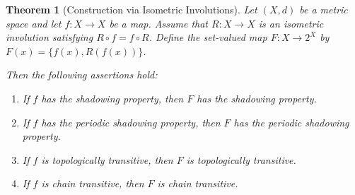 \documentclass[10pt,a4paper]{amsart}
\newtheorem{theorem}{Theorem}
\begin{document}
\begin{theorem}[Construction via Isometric Involutions]
\label{thm:involution}
Let $(X,d)$ be a metric space and let $f:X\to X$ be a map. Assume that $R:X\to X$ is an isometric involution satisfying $
R\circ f=f\circ R$.
Define the set-valued map $F:X\to 2^X$ by $F(x)=\{f(x),R(f(x))\}$.

Then the following assertions hold:

\begin{enumerate}
    \item If $f$ has the shadowing property, then $F$ has the shadowing property.

    \item If $f$ has the periodic shadowing property, then $F$ has the periodic shadowing property.

    \item If $f$ is topologically transitive, then $F$ is topologically transitive.

    \item If $f$ is chain transitive, then $F$ is chain transitive.
\end{enumerate}
\end{theorem}
\end{document}

